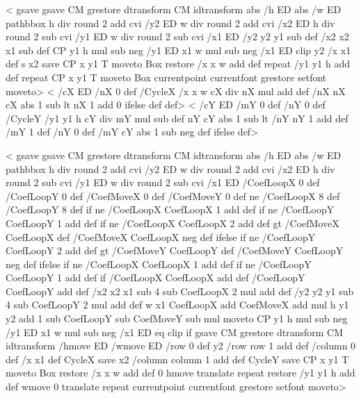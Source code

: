 <%
  gsave
    gsave \tx@STV CM grestore dtransform CM idtransform
    abs /h ED abs /w ED
    pathbbox
    h div round 2 add cvi /y2 ED
    w div round 2 add cvi /x2 ED
    h div round 2 sub cvi /y1 ED
    w div round 2 sub cvi /x1 ED
    /y2 y2 y1 sub def
    /x2 x2 x1 sub def
    CP
    y1 h mul sub neg /y1 ED
    x1 w mul sub neg /x1 ED
    clip
    y2 {
      /x x1 def
      s
      x2 {
        save CP x y1 T moveto Box restore
        /x x w add def
      } repeat
      /y1 y1 h add def
    } repeat
    CP x y1 T moveto Box
  currentpoint currentfont grestore setfont moveto>
\else
<%
  /cX ED
  /nX 0 def
  /CycleX {
    /x x w cX div nX mul add def
    /nX nX cX abs 1 sub lt { nX 1 add } { 0 } ifelse def
  } def>
<%
  /cY ED
  /mY 0 def
  /nY 0 def
  /CycleY {
    /y1 y1 h cY div mY mul sub def
    nY cY abs 1 sub lt { /nY nY 1 add def /mY 1 def }
                       { /nY 0 def        /mY cY abs 1 sub neg def } ifelse
  } def>

<%
  gsave
    gsave \tx@STV CM grestore dtransform CM idtransform
    abs /h ED abs /w ED
    pathbbox
    h div round 2 add cvi /y2 ED
    w div round 2 add cvi /x2 ED
    h div round 2 sub cvi /y1 ED
    w div round 2 sub cvi /x1 ED
    /CoefLoopX 0 def
    /CoefLoopY 0 def
    /CoefMoveX 0 def
    /CoefMoveY 0 def
     ne {/CoefLoopX 8 def /CoefLoopY 8 def} if
     ne {/CoefLoopX CoefLoopX 1 add def} if
     ne {/CoefLoopY CoefLoopY 1 add def} if
     ne
      {/CoefLoopX CoefLoopX 2 add def
        gt {/CoefMoveX CoefLoopX def}
                           {/CoefMoveX CoefLoopX neg def} ifelse} if
     ne
      {/CoefLoopY CoefLoopY 2 add def
        gt {/CoefMoveY CoefLoopY def}
                           {/CoefMoveY CoefLoopY neg def} ifelse} if
     ne {/CoefLoopX CoefLoopX 1 add def} if
     ne {/CoefLoopY CoefLoopY 1 add def} if
    /CoefLoopX CoefLoopX \psk@fillloopaddx add def
    /CoefLoopY CoefLoopY \psk@fillloopaddy add def
%
    /x2 x2 x1 sub 4 sub CoefLoopX 2 mul add def
    /y2 y2 y1 sub 4 sub CoefLoopY 2 mul add def
    w x1 CoefLoopX add CoefMoveX add mul
      h y1 y2 add 1 sub CoefLoopY sub CoefMoveY sub mul moveto
%
    CP
    y1 h mul sub neg /y1 ED
    x1 w mul sub neg /x1 ED
     eq {clip} if
    \psk@fillmovex \psk@fillmovey
    gsave \tx@STV CM grestore dtransform CM idtransform
    /hmove ED /wmove ED
%
    /row 0 def
   y2 {
       /row row 1 add def
       /column 0 def
       /x x1 def
       CycleX
       save
       x2 {
          /column column 1 add def
          CycleY
          save CP x y1 T moveto Box restore
          /x x w add def
          0 hmove translate
          } repeat
       restore
       /y1 y1 h add def
       wmove 0 translate
       } repeat
  currentpoint currentfont grestore setfont moveto>
\fi

